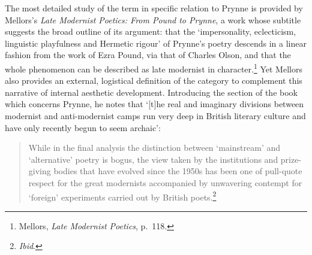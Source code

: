 \documentclass[]{article}
\begin{document}
The most detailed study of the term in specific relation to Prynne is
provided by Mellors’s \emph{Late Modernist Poetics: From Pound to
Prynne}, a work whose subtitle suggests the broad outline of its
argument: that the ‘impersonality, eclecticism, linguistic playfulness
and Hermetic rigour’ of Prynne’s poetry descends in a linear fashion
from the work of Ezra Pound, via that of Charles Olson, and that the
whole phenomenon can be described as late modernist in
character.\footnote{Mellors, \emph{Late Modernist Poetics}, p.~118.} Yet
Mellors also provides an external, logistical definition of the category
to complement this narrative of internal aesthetic development.
Introducing the section of the book which concerns Prynne, he notes that
‘{[}t{]}he real and imaginary divisions between modernist and
anti-modernist camps run very deep in British literary culture and have
only recently begun to seem archaic’:

\begin{quote}
\singlespacing While in the final analysis the distinction between
‘mainstream’ and ‘alternative’ poetry is bogus, the view taken by the
institutions and prize-giving bodies that have evolved since the 1950s
has been one of pull-quote respect for the great modernists accompanied
by unwavering contempt for ‘foreign’ experiments carried out by British
poets.\footnote{\emph{Ibid}.}
\end{quote}
\end{document}
